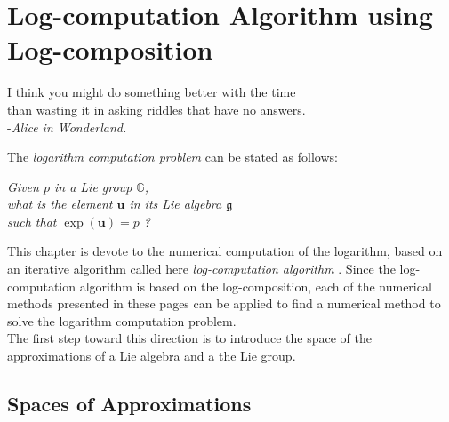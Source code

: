 \chapter{Log-computation Algorithm using Log-composition}\label{ch:log_computations}

\begin{flushright}
	I think you might do something better with the time \\ than wasting it in asking riddles that have no answers. \\ -\emph{Alice in Wonderland.}
\end{flushright}

\vspace{0.5 cm}

\noindent
The \emph{logarithm computation problem} can be stated as follows:
\begin{center}
\emph{
	Given $p$ in a Lie group $\mathbb{G}$, \\ 
	what is the element $\mathbf{u}$ in its Lie algebra $\mathfrak{g}$ \\
	such that $\exp(\mathbf{u}) = p$ ?  
}
\end{center}
This chapter is devote to the numerical computation of the logarithm, based on an iterative algorithm called here \emph{log-computation algorithm} \cite{Bossa:08}. Since the log-computation algorithm is based on the log-composition, each of the numerical methods presented in these pages can be applied to find a numerical method to solve the logarithm computation problem.\\
The first step toward this direction is to introduce the space of the approximations of a Lie algebra and a the Lie group.


\section{Spaces of Approximations}\label{se:space_of_approximation}

